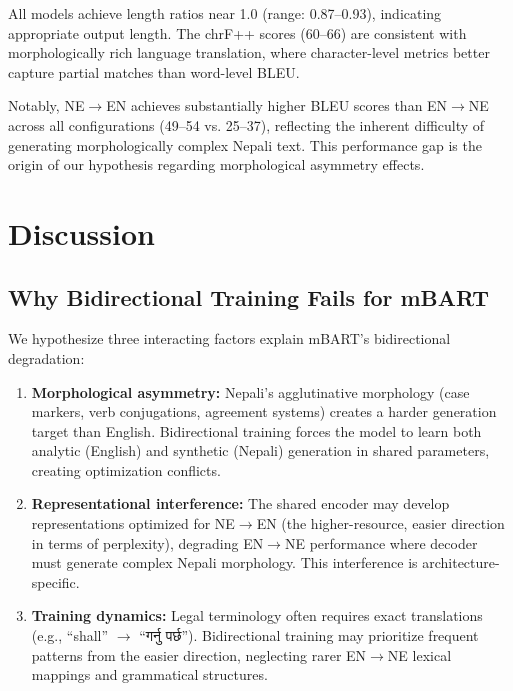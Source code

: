 \documentclass[manuscript, screen, review]{acmart}
\begin{document}
All models achieve length ratios near 1.0 (range: 0.87--0.93), indicating appropriate output length. The chrF++ scores (60--66) are consistent with morphologically rich language translation, where character-level metrics better capture partial matches than word-level BLEU.

Notably, NE$\rightarrow$EN achieves substantially higher BLEU scores than EN$\rightarrow$NE across all configurations (49--54 vs. 25--37), reflecting the inherent difficulty of generating morphologically complex Nepali text. This performance gap is the origin of our hypothesis regarding morphological asymmetry effects.

\section{Discussion}
\label{sec:discussion}

\subsection{Why Bidirectional Training Fails for mBART}
\label{subsec:why_mbart_fails}

We hypothesize three interacting factors explain mBART's bidirectional degradation:

\begin{enumerate}
\item \textbf{Morphological asymmetry:} Nepali's agglutinative morphology (case markers, verb conjugations, agreement systems) creates a harder generation target than English. Bidirectional training forces the model to learn both analytic (English) and synthetic (Nepali) generation in shared parameters, creating optimization conflicts.

\item \textbf{Representational interference:} The shared encoder may develop representations optimized for NE$\rightarrow$EN (the higher-resource, easier direction in terms of perplexity), degrading EN$\rightarrow$NE performance where decoder must generate complex Nepali morphology. This interference is architecture-specific.

\item \textbf{Training dynamics:} Legal terminology often requires exact translations (e.g., ``shall'' $\rightarrow$ ``गर्नु पर्छ''). Bidirectional training may prioritize frequent patterns from the easier direction, neglecting rarer EN$\rightarrow$NE lexical mappings and grammatical structures.
\end{enumerate}
\end{document}
